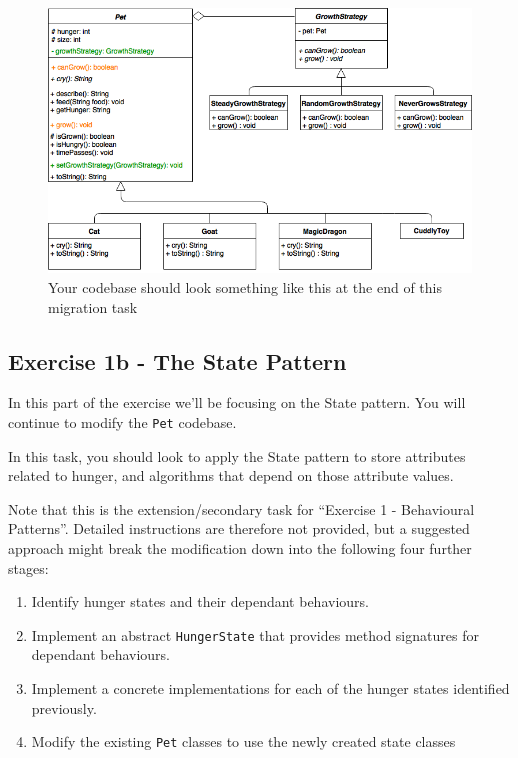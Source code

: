 \documentclass[
]{book}
\providecommand{\tightlist}{%
  \setlength{\itemsep}{0pt}\setlength{\parskip}{0pt}}
\begin{document}
\begin{figure}

{\centering \includegraphics[width=1\linewidth]{images/GrowthStrategy} 

}

\caption{Your codebase should look something like this at the end of this migration task}\label{fig:petstrategy-fig}
\end{figure}

\hypertarget{state}{%
\subsection{Exercise 1b - The State Pattern}\label{state}}

In this part of the exercise we'll be focusing on the State pattern. You will continue to modify the \texttt{Pet} codebase.

In this task, you should look to apply the State pattern to store attributes related to hunger, and algorithms that depend on those attribute values.

Note that this is the extension/secondary task for ``Exercise 1 - Behavioural Patterns''. Detailed instructions are therefore not provided, but a suggested approach might break the modification down into the following four further stages:

\begin{enumerate}
\def\labelenumi{\arabic{enumi}.}
\tightlist
\item
  Identify hunger states and their dependant behaviours.
\item
  Implement an abstract \texttt{HungerState} that provides method signatures for dependant behaviours.
\item
  Implement a concrete implementations for each of the hunger states identified previously.
\item
  Modify the existing \texttt{Pet} classes to use the newly created state classes
\end{enumerate}
\end{document}
